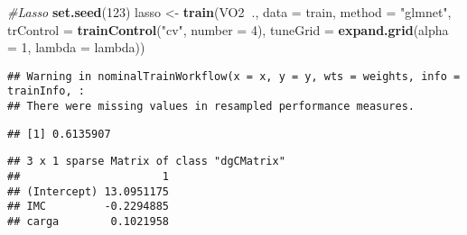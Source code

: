 \documentclass[]{article}
\newenvironment{Shaded}{\begin{snugshade}}{\end{snugshade}}
\newcommand{\CommentTok}[1]{\textcolor[rgb]{0.56,0.35,0.01}{\textit{#1}}}
\newcommand{\DataTypeTok}[1]{\textcolor[rgb]{0.13,0.29,0.53}{#1}}
\newcommand{\DecValTok}[1]{\textcolor[rgb]{0.00,0.00,0.81}{#1}}
\newcommand{\KeywordTok}[1]{\textcolor[rgb]{0.13,0.29,0.53}{\textbf{#1}}}
\newcommand{\NormalTok}[1]{#1}
\newcommand{\OperatorTok}[1]{\textcolor[rgb]{0.81,0.36,0.00}{\textbf{#1}}}
\newcommand{\StringTok}[1]{\textcolor[rgb]{0.31,0.60,0.02}{#1}}
\begin{document}
\begin{Shaded}
\begin{Highlighting}[]
\CommentTok{#Lasso}
\KeywordTok{set.seed}\NormalTok{(}\DecValTok{123}\NormalTok{)}
\NormalTok{lasso <-}\StringTok{ }\KeywordTok{train}\NormalTok{(VO2}\OperatorTok{~}\NormalTok{., }\DataTypeTok{data =}\NormalTok{ train, }\DataTypeTok{method =} \StringTok{"glmnet"}\NormalTok{, }\DataTypeTok{trControl =} \KeywordTok{trainControl}\NormalTok{(}\StringTok{"cv"}\NormalTok{, }\DataTypeTok{number =} \DecValTok{4}\NormalTok{), }\DataTypeTok{tuneGrid =} \KeywordTok{expand.grid}\NormalTok{(}\DataTypeTok{alpha =} \DecValTok{1}\NormalTok{, }\DataTypeTok{lambda =}\NormalTok{ lambda))}
\end{Highlighting}
\end{Shaded}

\begin{verbatim}
## Warning in nominalTrainWorkflow(x = x, y = y, wts = weights, info = trainInfo, :
## There were missing values in resampled performance measures.
\end{verbatim}

\begin{Shaded}
\end{Shaded}

\begin{verbatim}
## [1] 0.6135907
\end{verbatim}

\begin{Shaded}
\end{Shaded}

\begin{verbatim}
## 3 x 1 sparse Matrix of class "dgCMatrix"
##                      1
## (Intercept) 13.0951175
## IMC         -0.2294885
## carga        0.1021958
\end{verbatim}

\begin{Shaded}
\end{Shaded}
\end{document}
